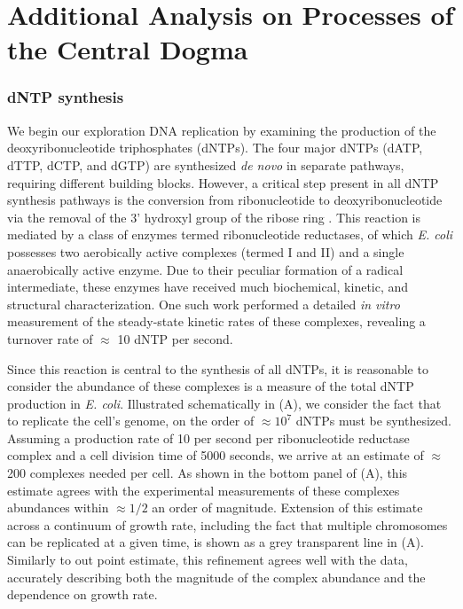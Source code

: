 \section{Additional Analysis on Processes of the Central Dogma}
\label{sec:SI_central_dogma}

\subsubsection{dNTP synthesis}
We begin our exploration DNA replication by examining the
production of the deoxyribonucleotide triphosphates (dNTPs). The four major
dNTPs (dATP, dTTP, dCTP, and dGTP) are synthesized \textit{de novo} in separate
pathways, requiring different building blocks. However, a critical step present
in all dNTP synthesis pathways is the conversion from ribonucleotide to
deoxyribonucleotide via the removal of the 3' hydroxyl group of the ribose ring
\citep{rudd2016}. This reaction is mediated by a class of enzymes termed
ribonucleotide reductases, of which \textit{E. coli} possesses two aerobically
active complexes (termed I and II) and a single anaerobically active enzyme. Due
to their peculiar formation of a radical intermediate, these enzymes have
received much biochemical, kinetic, and structural characterization.  One such
work \citep{ge2003} performed a detailed \textit{in vitro} measurement of the
steady-state kinetic rates of these complexes, revealing a turnover rate of
$\approx$ 10 dNTP per second.

Since this reaction is central to the synthesis of all dNTPs, it is reasonable
to consider the abundance of these complexes is a measure of the total dNTP
production in \textit{E. coli}. Illustrated schematically in 
(A), we consider the fact that to replicate the cell's genome, on the order of
$\approx 10^7$ dNTPs must be synthesized. Assuming a production rate of 10 per
second per ribonucleotide reductase complex and a cell division time of 5000
seconds, we arrive at an estimate of $\approx$ 200 complexes needed per cell. As
shown in the bottom panel of  (A), this estimate agrees with
the experimental measurements of these complexes abundances within $\approx 1/2$
an order of magnitude. Extension of this estimate across a continuum of growth
rate, including the fact that multiple chromosomes can be replicated at a given
time, is shown as a grey transparent line in (A). Similarly
to out point estimate, this refinement agrees well with the data, accurately
describing both the magnitude of the complex abundance and the dependence on
growth rate.

